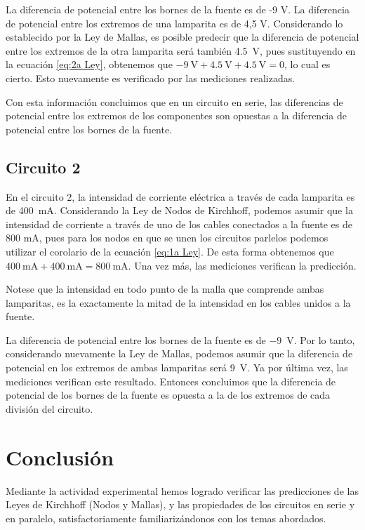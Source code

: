 \documentclass{article}
\begin{document}
La diferencia de potencial entre los bornes de la fuente es de -9 V. La diferencia de potencial entre los extremos de una lamparita es de 4,5 V. Considerando lo establecido por la Ley de Mallas, es posible predecir que la diferencia de potencial entre los extremos de la otra lamparita será también \SI{4,5}{\volt}, pues sustituyendo en la ecuación \ref{eq:2a Ley}, obtenemos que $\SI{-9}{\volt} + \SI{4,5}{\volt} + \SI{4,5}{\volt} = 0$, lo cual es cierto. Esto nuevamente es verificado por las mediciones realizadas.

Con esta información concluimos que en un circuito en serie, las diferencias de potencial entre los extremos de los componentes son opuestas a la diferencia de potencial entre los bornes de la fuente. 

\subsection{Circuito 2}

En el circuito 2, la intensidad de corriente eléctrica a través de cada lamparita es de \SI{400}{\milli\ampere}. Considerando la Ley de Nodos de Kirchhoff, podemos asumir que la intensidad de corriente a través de uno de los cables conectados a la fuente es de 800 mA, pues para los nodos en que se unen los circuitos parlelos podemos utilizar el corolario de la ecuación \ref{eq:1a Ley}. De esta forma obtenemos que $\SI{400}{\milli\ampere} + \SI{400}{\milli\ampere} = \SI{800}{\milli\ampere}$. Una vez más, las mediciones verifican la predicción.

Notese que la intensidad en todo punto de la malla que comprende ambas lamparitas, es la exactamente la mitad de la intensidad en los cables unidos a la fuente.

La diferencia de potencial entre los bornes de la fuente es de \SI{-9}{\volt}. Por lo tanto, considerando nuevamente la Ley de Mallas, podemos asumir que la diferencia de potencial en los extremos de ambas lamparitas será \SI{9}{\volt}. Ya por última vez, las mediciones verifican este resultado. Entonces concluimos que la diferencia de potencial de los bornes de la fuente es opuesta a la de los extremos de cada división del circuito.

\section{Conclusión}

Mediante la actividad experimental hemos logrado verificar las predicciones de las Leyes de Kirchhoff (Nodos y Mallas), y las propiedades de los circuitos en serie y en paralelo, satisfactoriamente familiarizándonos con los temas abordados.
\end{document}
